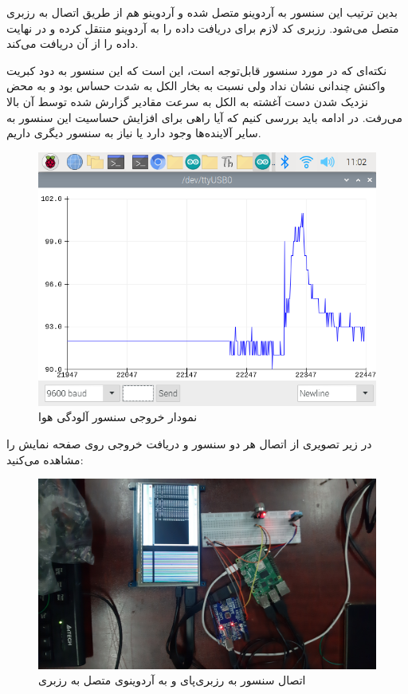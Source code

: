 \documentclass[12pt]{article}
\begin{document}
\begin{itemize}
	بدین ترتیب این سنسور به آردوینو متصل شده و آردوینو هم از طریق اتصال  به رزبری متصل می‌شود. رزبری کد لازم برای دریافت داده را به آردوینو منتقل کرده و در نهایت داده را از آن دریافت می‌کند.
	
		نکته‌ای که در مورد سنسور  قابل‌توجه است، این است که این سنسور به دود کبریت واکنش چندانی نشان نداد ولی نسبت به بخار الکل به شدت حساس بود و به محض نزدیک شدن دست آغشته به الکل به سرعت مقادیر گزارش شده توسط آن بالا می‌رفت. در ادامه باید بررسی کنیم که آیا راهی برای افزایش حساسیت این سنسور به سایر آلاینده‌ها وجود دارد یا نیاز به سنسور دیگری داریم.
	
	\begin{figure}[H]
		\begin{center}
			\includegraphics[width=.70\textwidth]{images/mq135-graph.png}
		\end{center}
		\caption{نمودار خروجی سنسور آلودگی هوا}
	\end{figure}

	
	در زیر تصویری از اتصال هر دو سنسور و دریافت خروجی روی صفحه نمایش را مشاهده می‌کنید:
	
	
	
	\begin{figure}[H]
		\begin{center}
			\includegraphics[width=.70\textwidth]{images/dhtmq1.jpg} 
		\end{center}
		\caption{اتصال سنسور    به رزبری‌پای و  به آردوینوی متصل به رزبری}
	\end{figure}
	

\end{itemize}
\end{document}
